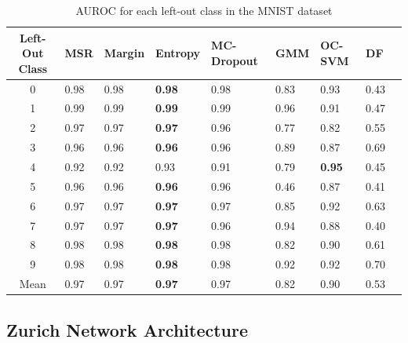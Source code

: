 \documentclass[10pt]{article}
\begin{document}
\begin{table}[H]
    \centering
    \begin{tabular}{@{}cllllllll@{}}
    \toprule
    Left-Out Class & \gls{MSR}  & Margin & Entropy & \gls{MC-Dropout} & \gls{GMM}  & \gls{OC-SVM}  & \gls{DF}                 \\ \midrule
    0              & 0.98 & 0.98 & \textbf{0.98}& 0.98 & 0.83 & 0.93 & 0.43 \\
    1              & 0.99 & 0.99 & \textbf{0.99}& 0.99 & 0.96 & 0.91 & 0.47\\
    2              & 0.97 & 0.97 & \textbf{0.97} & 0.96 & 0.77 & 0.82 & 0.55 \\
    3              & 0.96 & 0.96 & \textbf{0.96} & 0.96 & 0.89 & 0.87 & 0.69 \\
    4              & 0.92 & 0.92 & 0.93 & 0.91 & 0.79 & \textbf{0.95} & 0.45\\
    5              & 0.96 & 0.96 & \textbf{0.96} & 0.96 & 0.46 & 0.87 & 0.41 \\
    6              & 0.97 & 0.97 & \textbf{0.97} & 0.97 & 0.85 & 0.92 & 0.63\\
    7              & 0.97 & 0.97 & \textbf{0.97} & 0.96 & 0.94 & 0.88 & 0.40\\
    8              & 0.98 & 0.98 & \textbf{0.98} & 0.98 & 0.82 & 0.90 & 0.61\\
    9              & 0.98 & 0.98 & \textbf{0.98} & 0.98 & 0.92 & 0.92 & 0.70 \\\midrule
    Mean           & 0.97 & 0.97 & \textbf{0.97} & 0.97 & 0.82 & 0.90 & 0.53 \\\bottomrule
    \end{tabular}
    \caption{\gls{AUROC} for each left-out class in the MNIST dataset}
    \label{table:mnist-auroc-nd}
\end{table}


\subsection{Zurich Network Architecture}
\end{document}
